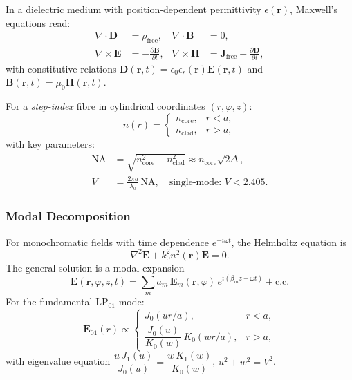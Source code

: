 \documentclass[journal,twocolumn]{IEEEtran}
\theoremstyle{definition}
\theoremstyle{plain}
\begin{document}
In a dielectric medium with position-dependent permittivity
$\epsilon(\mathbf{r})$, Maxwell's equations read:
\begin{align}
  \nabla\cdot\mathbf{D} &= \rho_{\mathrm{free}}, &
  \nabla\cdot\mathbf{B} &= 0, \label{eq:maxwell12}\\
  \nabla\times\mathbf{E} &= -\frac{\partial\mathbf{B}}{\partial t}, &
  \nabla\times\mathbf{H} &= \mathbf{J}_{\mathrm{free}}
    +\frac{\partial\mathbf{D}}{\partial t}, \label{eq:maxwell34}
\end{align}
with constitutive relations
$\mathbf{D}(\mathbf{r},t)=\epsilon_0\epsilon_r(\mathbf{r})\mathbf{E}(\mathbf{r},t)$
and $\mathbf{B}(\mathbf{r},t)=\mu_0\mathbf{H}(\mathbf{r},t)$.

For a \emph{step-index} fibre in cylindrical coordinates
$(r,\varphi,z)$:
\begin{equation}
  n(r) = \begin{cases}
    n_{\mathrm{core}}, & r < a,\\
    n_{\mathrm{clad}}, & r > a,
  \end{cases}
\end{equation}
with key parameters:
\begin{align}
  \mathrm{NA} &= \sqrt{n_{\mathrm{core}}^2 - n_{\mathrm{clad}}^2}
    \approx n_{\mathrm{core}}\sqrt{2\Delta}, \nonumber\\
  V &= \frac{2\pi a}{\lambda_0}\,\mathrm{NA},\quad
    \text{single-mode: } V < 2.405.
\end{align}

\subsubsection{Modal Decomposition}

For monochromatic fields with time dependence $e^{-i\omega t}$, the
Helmholtz equation is
\begin{equation}
  \nabla^2\mathbf{E} + k_0^2 n^2(\mathbf{r})\mathbf{E} = 0.
\end{equation}
The general solution is a modal expansion
\begin{equation}
  \mathbf{E}(\mathbf{r},\varphi,z,t) = \sum_m a_m\,
  \mathbf{E}_m(\mathbf{r},\varphi)\,e^{i(\beta_m z - \omega t)}
  + \text{c.c.}
\end{equation}
For the fundamental LP$_{01}$ mode:
\begin{equation}
  \mathbf{E}_{01}(r) \propto
  \begin{cases}
    J_0(ur/a), & r < a,\\[4pt]
    \dfrac{J_0(u)}{K_0(w)}\,K_0(wr/a), & r > a,
  \end{cases}
\end{equation}
with eigenvalue equation
$\dfrac{u\,J_1(u)}{J_0(u)}=\dfrac{w\,K_1(w)}{K_0(w)}$,\quad
$u^2+w^2=V^2$.
\end{document}
